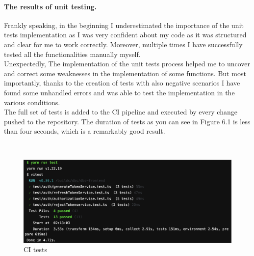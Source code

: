\paragraph*{The results of unit testing.} Frankly speaking, in the beginning I underestimated the importance of the unit tests implementation as I was very confident about my code as it was structured and clear for me to work correctly. Moreover, multiple times I have successfully tested all the functionalities manually myself.\\
Unexpectedly, The implementation of the unit tests process helped me to uncover and correct some weaknesses in the implementation of some functions. But most importantly, thanks to the creation of tests with also negative scenarios I have found some unhandled errors and was able to test the implementation in the various conditions.\\
The full set of tests is added to the CI pipeline and executed by every change pushed to the repository. The duration of tests as you can see in Figure 6.1 is less than four seconds, which is a remarkably good result.

 \

\begin{figure}[h]
\centering
\includegraphics[scale=0.47]{../png/tests.png}
\caption{CI tests}\label{picture:tests}
\end{figure}

